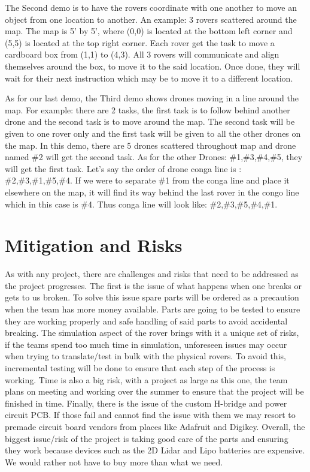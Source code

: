 \documentclass[conference]{IEEEtran}
\begin{document}
The Second demo is to have the rovers coordinate with one another to move an object from one location to another. An example: 3 rovers scattered around the map. The map is 5’ by 5’, where (0,0) is located at the bottom left corner and (5,5) is located at the top right corner. Each rover get the task to move a cardboard box from (1,1) to (4,3). All 3 rovers will communicate and align themselves around the box, to move it to the said location. Once done, they will wait for their next instruction which may be to move it to a different location. 

As for our last demo, the Third demo shows drones moving in a line around the map. For example: there are 2 tasks, the first task is to follow behind another drone and the second task is to move around the map. The second task will be given to one rover only and the first task will be given to all the other drones on the map. In this demo, there are 5 drones scattered throughout map and drone named \#2 will get the second task. As for the other Drones: \#1,\#3,\#4,\#5, they will get the first task. Let’s say the order of drone conga line is : \#2,\#3,\#1,\#5,\#4. If we were to separate \#1 from the conga line and place it elsewhere on the map, it will find its way behind the last rover in the congo line which in this case is \#4. Thus conga line will look like: \#2,\#3,\#5,\#4,\#1.

\section{Mitigation and Risks}
As with any project, there are challenges and risks that need to be addressed as the project progresses. The first is the issue of what happens when one breaks or gets to us broken. To solve this issue spare parts will be ordered as a precaution when the team has more money available. Parts are going to be tested to ensure they are working properly and safe handling of said parts to avoid accidental breaking. The simulation aspect of the rover brings with it a unique set of risks, if the teams spend too much time in simulation, unforeseen issues may occur when trying to translate/test in bulk with the physical rovers. To avoid this, incremental testing will be done to ensure that each step of the process is working. Time is also a big risk, with a project as large as this one, the team plans on meeting and working over the summer to ensure that the project will be finished in time. Finally, there is the issue of the custom H-bridge and power circuit PCB. If those fail and cannot find the issue with them we may resort to premade circuit board vendors from places like Adafruit and Digikey. Overall, the biggest issue/risk of the project is taking good care of the parts and ensuring they work because devices such as the 2D Lidar and Lipo batteries are expensive. We would rather not have to buy more than what we need.

\nocite{*}

\vspace{12pt}
\end{document}
